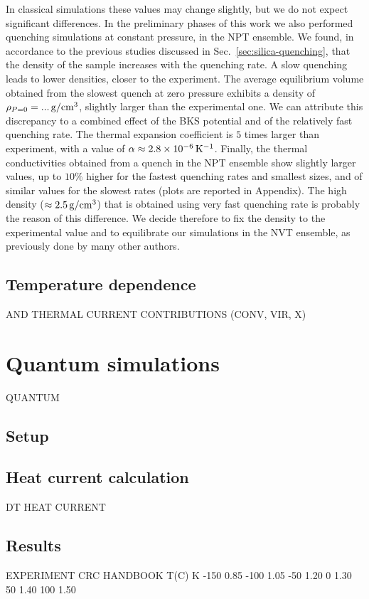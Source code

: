 In classical simulations these values may change slightly, but we do not expect significant differences. 
In the preliminary phases of this work we also performed quenching simulations at constant pressure, in the NPT ensemble. 
We found, in accordance to the previous studies discussed in Sec.~\ref{sec:silica-quenching}, that the density of the sample increases with the quenching rate. A slow quenching leads to lower densities, closer to the experiment. The average equilibrium volume obtained from the slowest quench at zero pressure exhibits a density of $\rho_{P=0}=...\,\mathrm{g/cm^3}$, slightly larger than the experimental one. We can attribute this discrepancy to a combined effect of the BKS potential and of the relatively fast quenching rate. 
The thermal expansion coefficient is $5$ times larger than experiment, with a value of $\alpha\approx 2.8\times 10^{-6} \,\mathrm{K^{-1}}$. 
Finally, the thermal conductivities obtained from a quench in the NPT ensemble show slightly larger values, up to $10\%$ higher for the fastest quenching rates and smallest sizes, and of similar values for the slowest rates (plots are reported in Appendix\LEnote{*****}). The high density ($\approx 2.5\,\mathrm{g/cm^3}$) that is obtained using very fast quenching rate is probably the reason of this difference. 
We decide therefore to fix the density to the experimental value and to equilibrate our simulations in the NVT ensemble, as previously done by many other authors.



\subsection{Temperature dependence}
AND THERMAL CURRENT CONTRIBUTIONS (CONV, VIR, X)


\section{Quantum simulations}  \label{sec:results-quantum}
QUANTUM

\subsection{Setup}  \label{sec:results-quantum-setup}

\subsection{Heat current calculation}  \label{sec:results-quantum-current}
DT HEAT CURRENT

\subsection{Results}  \label{sec:results-quantum-results}


EXPERIMENT CRC HANDBOOK
T(C)  K
-150 0.85
-100 1.05
-50 1.20
0 1.30
50 1.40
100 1.50